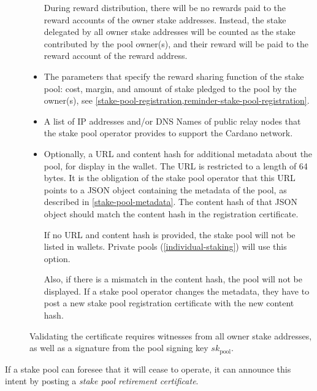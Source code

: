 \documentclass[11pt,a4paper,dvipsnames,twosided]{article}
\begin{document}
\begin{description}
\begin{itemize}
  During reward distribution, there will be no rewards paid to the reward
  accounts of the owner stake addresses. Instead, the stake delegated by all owner
  stake addresses will be counted as the stake contributed by the pool owner(s),
  and their reward will be paid to the reward account of the reward address.

\item
  The parameters that specify the reward sharing function of the stake
  pool: cost, margin, and amount of stake pledged to the pool by the
  owner(s), see \cref{stake-pool-registration,reminder-stake-pool-registration}.

\item
  A list of IP addresses and/or DNS Names of public relay nodes that the stake
  pool operator provides to support the Cardano network.

\item
  Optionally, a URL and content hash for additional metadata about the pool, for
  display in the wallet. The URL is restricted to a length of 64 bytes. It is
  the obligation of the stake pool operator that this URL points to a JSON
  object containing the metadata of the pool, as described in
  \cref{stake-pool-metadata}. The content hash of that JSON object should match
  the content hash in the registration certificate.

  If no URL and content hash is provided, the stake pool will not be listed in
  wallets. Private pools (\cref{individual-staking}) will use this option.

  Also, if there is a mismatch in the content hash, the pool will not be
  displayed. If a stake pool operator changes the metadata, they have to post a
  new stake pool registration certificate with the new content hash.
\end{itemize}

Validating the certificate requires witnesses from all owner stake addresses, as
well as a signature from the pool signing key \(sk_\text{pool}\).

\end{description}

If a stake pool can foresee that it will cease to operate, it can
announce this intent by posting a \emph{stake pool retirement
certificate}.
\end{document}
